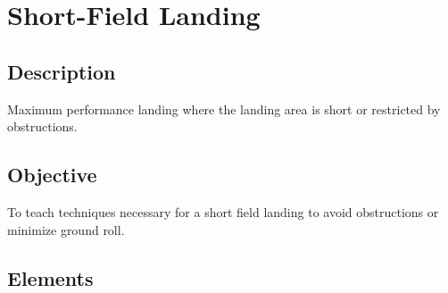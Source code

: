 \section{Short-Field Landing}

\subsection{Description}

Maximum performance landing where the landing area is short or restricted by
obstructions.

\subsection{Objective}

To teach techniques necessary for a short field landing to avoid obstructions
or minimize ground roll.

\subsection{Elements}

